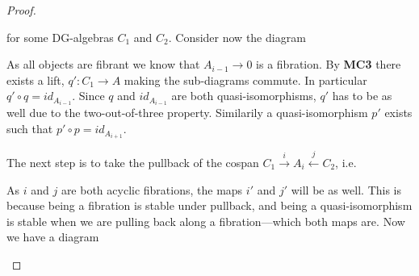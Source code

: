 \begin{proof}
\begin{center}
\end{center}
for some DG-algebras $C_1$ and $C_2$. Consider now the diagram
\begin{center}
\end{center}
As all objects are fibrant we know that $A_{i-1}\longrightarrow 0$ is a fibration. By \textbf{MC3}  there exists a lift, $q'\colon C_1\longrightarrow A$ making the sub-diagrams commute. In particular $q'\circ q = id_{A_{i-1}}$. Since $q$ and $id_{A_{i-1}}$ are both quasi-isomorphisms, $q'$ has to be as well due to the two-out-of-three property. Similarily a quasi-isomorphism $p'$ exists such that $p'\circ p = id_{A_{i+1}}$. 

The next step is to take the pullback of the cospan $C_1\overset{i}\longrightarrow A_i\overset{j}\longleftarrow C_2$, i.e.
\begin{center}
\end{center}
As $i$ and $j$ are both acyclic fibrations, the maps $i'$ and $j'$ will be as well. This is because being a fibration is stable under pullback, and being a quasi-isomorphism is stable when we are pulling back along a fibration---which both maps are. Now we have a diagram

\begin{center}
\end{center}
\end{proof}
